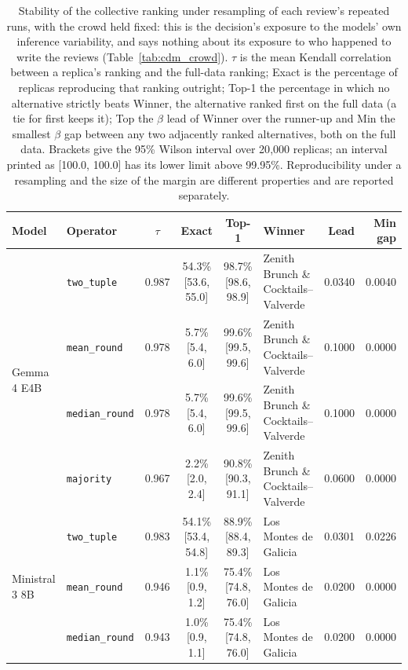 \begin{table}[htbp]
\centering
\caption{Stability of the collective ranking under resampling of each review's repeated runs, with the crowd held fixed: this is the decision's exposure to the models' own inference variability, and says nothing about its exposure to who happened to write the reviews (Table~\ref{tab:cdm_crowd}). $\tau$ is the mean Kendall correlation between a replica's ranking and the full-data ranking; Exact is the percentage of replicas reproducing that ranking outright; Top-1 the percentage in which no alternative strictly beats Winner, the alternative ranked first on the full data (a tie for first keeps it); Top the $\beta$ lead of Winner over the runner-up and Min the smallest $\beta$ gap between any two adjacently ranked alternatives, both on the full data. Brackets give the 95\% Wilson interval over 20{,}000 replicas; an interval printed as [100.0, 100.0] has its lower limit above 99.95\%. Reproducibility under a resampling and the size of the margin are different properties and are reported separately.}
\label{tab:cdm_stability}
\small
\begin{tabular}{llccclrr}
\toprule
\textbf{Model} & \textbf{Operator} & \textbf{$\tau$} & \textbf{Exact} & \textbf{Top-1} & \textbf{Winner} & \textbf{Lead} & \textbf{Min gap} \\
\midrule
  \multirow{4}{*}{Gemma 4 E4B} & \texttt{two\_tuple} & 0.987 & 54.3\% \tiny[53.6, 55.0] & 98.7\% \tiny[98.6, 98.9] & Zenith Brunch \& Cocktails--Valverde & 0.0340 & 0.0040 \\
   & \texttt{mean\_round} & 0.978 & 5.7\% \tiny[5.4, 6.0] & 99.6\% \tiny[99.5, 99.6] & Zenith Brunch \& Cocktails--Valverde & 0.1000 & 0.0000 \\
   & \texttt{median\_round} & 0.978 & 5.7\% \tiny[5.4, 6.0] & 99.6\% \tiny[99.5, 99.6] & Zenith Brunch \& Cocktails--Valverde & 0.1000 & 0.0000 \\
   & \texttt{majority} & 0.967 & 2.2\% \tiny[2.0, 2.4] & 90.8\% \tiny[90.3, 91.1] & Zenith Brunch \& Cocktails--Valverde & 0.0600 & 0.0000 \\
\midrule
  \multirow{4}{*}{Ministral 3 8B} & \texttt{two\_tuple} & 0.983 & 54.1\% \tiny[53.4, 54.8] & 88.9\% \tiny[88.4, 89.3] & Los Montes de Galicia & 0.0301 & 0.0226 \\
   & \texttt{mean\_round} & 0.946 & 1.1\% \tiny[0.9, 1.2] & 75.4\% \tiny[74.8, 76.0] & Los Montes de Galicia & 0.0200 & 0.0000 \\
   & \texttt{median\_round} & 0.943 & 1.0\% \tiny[0.9, 1.1] & 75.4\% \tiny[74.8, 76.0] & Los Montes de Galicia & 0.0200 & 0.0000 \\

\end{tabular}
\end{table}
